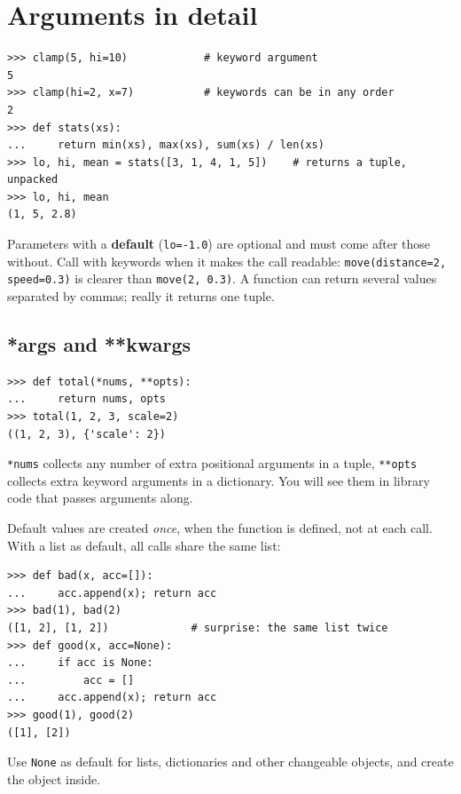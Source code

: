 \section*{Arguments in detail}
\begin{verbatim}
>>> clamp(5, hi=10)            # keyword argument
5
>>> clamp(hi=2, x=7)           # keywords can be in any order
2
>>> def stats(xs):
...     return min(xs), max(xs), sum(xs) / len(xs)
>>> lo, hi, mean = stats([3, 1, 4, 1, 5])    # returns a tuple, unpacked
>>> lo, hi, mean
(1, 5, 2.8)
\end{verbatim}
Parameters with a \textbf{default} (\texttt{lo=-1.0}) are optional and must come after those without. Call with keywords when it makes the call readable: \verb!move(distance=2, speed=0.3)! is clearer than \verb!move(2, 0.3)!. A function can return several values separated by commas; really it returns one tuple.

\subsection*{*args and **kwargs}
\begin{verbatim}
>>> def total(*nums, **opts):
...     return nums, opts
>>> total(1, 2, 3, scale=2)
((1, 2, 3), {'scale': 2})
\end{verbatim}
\texttt{*nums} collects any number of extra positional arguments in a tuple, \texttt{**opts} collects extra keyword arguments in a dictionary. You will see them in library code that passes arguments along.

\begin{keyidea}
Default values are created \emph{once}, when the function is defined, not at each call. With a list as default, all calls share the same list:
\end{keyidea}
\begin{verbatim}
>>> def bad(x, acc=[]):
...     acc.append(x); return acc
>>> bad(1), bad(2)
([1, 2], [1, 2])             # surprise: the same list twice
>>> def good(x, acc=None):
...     if acc is None:
...         acc = []
...     acc.append(x); return acc
>>> good(1), good(2)
([1], [2])
\end{verbatim}
Use \texttt{None} as default for lists, dictionaries and other changeable objects, and create the object inside.

